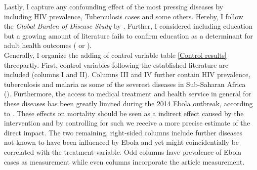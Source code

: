 \documentclass{article}
\begin{document}
Lastly, I capture any confounding effect of the most pressing diseases by including HIV prevalence, Tuberculosis cases and some others. Hereby, I follow the \textit{Global Burden of Disease Study} by \cite{lozano2012global}. Further, I considered including education but a growing amount of literature fails to confirm education as a determinant for adult health outcomes (\cite{clark2013effect} or \cite{meghir2018education}).\\
Generally, I organize the adding of control variable table \ref{Control results} threepartly. First, control variables following the established literature are included (columns I and II). Columns III and IV further contain HIV prevalence, tuberculosis and malaria as some of the severest diseases in Sub-Saharan Africa (\cite{lozano2012global}). Furthermore, the access to medical treatment and health service in general for these diseases has been greatly limited during the 2014 Ebola outbreak, according to \cite{parpia2016effects}. These effects on mortality should be seen as a indirect effect caused by the intervention and by controlling for such we receive a more precise estimate of the direct impact. The two remaining, right-sided columns include further diseases not known to have been influenced by Ebola and yet might coincidentially be correlated with the treatment variable. Odd columns have prevalence of Ebola cases as measurement while even columns incorporate the article measurement.\\
\end{document}
